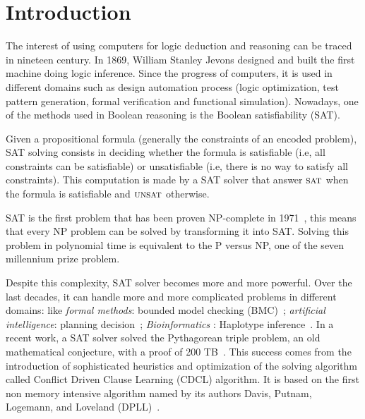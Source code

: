 \chapter{Introduction}\label{chap:intro}

%

The interest of using computers for logic deduction and reasoning can be traced in nineteen century.
In 1869,  William Stanley Jevons designed and built the first machine doing logic inference.
Since the progress of computers, it is used in different domains such as design automation process 
(logic optimization, test pattern generation, formal verification and functional simulation).
Nowadays, one of the methods used in Boolean reasoning is the Boolean satisfiability (SAT).

Given a propositional formula (generally the constraints of an encoded problem),
SAT solving consists in deciding whether the formula is satisfiable (i.e, all constraints can be
satisfiable) or unsatisfiable (i.e, there is no way to satisfy all constraints).
This computation is made by a SAT solver that answer $\textsc{sat}$ when the formula is satisfiable
and $\textsc{unsat}$ otherwise.

SAT is the first problem that has been proven NP-complete in 1971~\cite{cook1971complexity}, this 
means that every NP problem can be solved by transforming it into SAT. Solving this problem in 
polynomial time is equivalent to the P versus NP, one of the seven millennium prize problem.


Despite this complexity, SAT solver becomes more and more powerful.
Over the last decades, it can handle more and more complicated problems in different domains:
like \emph{formal methods}: bounded model checking (BMC)~\cite{bmc_99}; \emph{artificial intelligence}: planning decision~\cite{planning_92}; \emph{Bioinformatics} : Haplotype inference~\cite{biology_06}.
In a recent work, a SAT solver solved the Pythagorean triple problem, an old mathematical conjecture,
with a proof of 200 TB~\cite{heule2016solving}.
This success comes from the introduction of sophisticated heuristics and optimization of the solving 
algorithm called Conflict Driven Clause Learning (CDCL) algorithm. It is based on the first non memory
intensive algorithm named by its authors Davis, Putnam, Logemann, and Loveland (DPLL)~\cite{dpll_62}.


